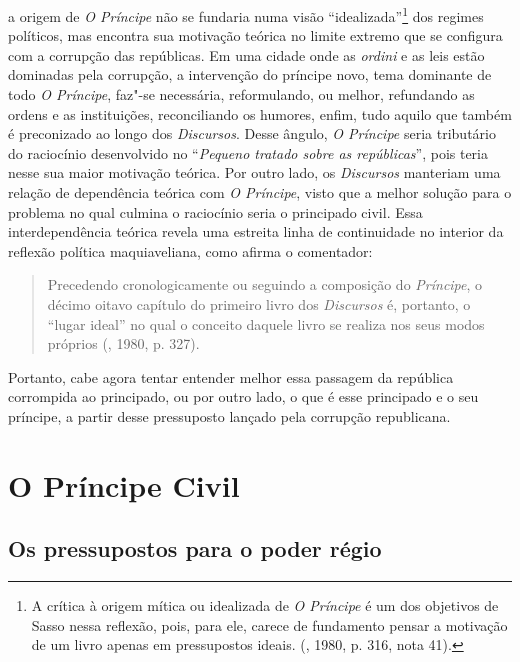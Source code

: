 a origem de \emph{O Príncipe} não se fundaria numa visão
``idealizada''\footnote{A crítica à origem mítica ou idealizada de
  \emph{O Príncipe} é um dos objetivos de Sasso nessa reflexão,
  pois, para ele, carece de fundamento pensar a motivação de um livro
  apenas em pressupostos ideais. (, 1980, p. 316, nota 41).} dos
regimes políticos, mas encontra sua motivação teórica no limite extremo
que se configura com a corrupção das repúblicas. Em uma cidade onde as
\emph{ordini} e as leis estão dominadas pela corrupção, a intervenção do
príncipe novo, tema dominante de todo \emph{O Príncipe}, faz"-se
necessária, reformulando, ou melhor, refundando as ordens e as
instituições, reconciliando os humores, enfim, tudo aquilo que também é
preconizado ao longo dos \emph{Discursos}. Desse ângulo, \emph{O
Príncipe} seria tributário do raciocínio desenvolvido no
``\emph{Pequeno tratado sobre as repúblicas}'', pois teria nesse sua
maior motivação teórica. Por outro lado, os \emph{Discursos} manteriam
uma relação de dependência teórica com \emph{O Príncipe}, visto
que a melhor solução para o problema no qual culmina o raciocínio seria
o principado civil. Essa interdependência teórica revela uma estreita
linha de continuidade no interior da reflexão política maquiaveliana,
como afirma o comentador:

\begin{quote}
Precedendo cronologicamente ou seguindo a composição do \emph{Príncipe},
o décimo oitavo capítulo do primeiro livro dos \emph{Discursos} é,
portanto, o ``lugar ideal'' no qual o conceito daquele livro se realiza
nos seus modos próprios (, 1980, p. 327).
\end{quote}

Portanto, cabe agora tentar entender melhor essa passagem da república
corrompida ao principado, ou por outro lado, o que é esse principado e o
seu príncipe, a partir desse pressuposto lançado pela corrupção
republicana.

\section{O Príncipe Civil}

\subsection{Os pressupostos para o poder régio}

